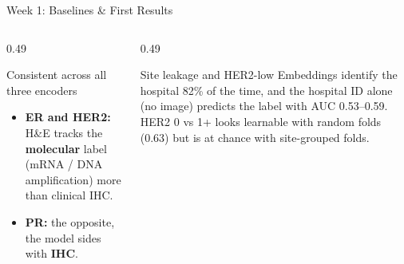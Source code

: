\documentclass[aspectratio=169,10pt]{beamer}
\begin{document}
\begin{frame}[t]{Week 1: Baselines \& First Results}
\vspace{3pt}
\raggedright
\begin{columns}[T]
\begin{column}{0.49\textwidth}
\begin{block}{Consistent across all three encoders}
\begin{itemize}
  \item \textbf{ER and HER2:} H\&E tracks the \textbf{molecular} label (mRNA / DNA amplification) more than clinical IHC.
  \item \textbf{PR:} the opposite, the model sides with \textbf{IHC}.
\end{itemize}
\end{block}
\end{column}
\begin{column}{0.49\textwidth}
\begin{alertblock}{Site leakage and HER2-low}
Embeddings identify the hospital 82\% of the time, and the hospital ID alone (no image) predicts the label with
AUC 0.53--0.59. HER2 0 vs 1+ looks learnable with random folds (0.63) but is at chance with site-grouped folds.
\end{alertblock}
\end{column}
\end{columns}
\end{frame}
\end{document}
